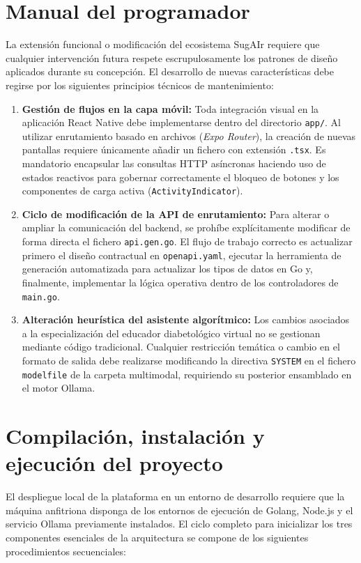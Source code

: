 \section{Manual del programador}
La extensión funcional o modificación del ecosistema SugAIr requiere que cualquier intervención futura respete escrupulosamente los patrones de diseño aplicados durante su concepción. El desarrollo de nuevas características debe regirse por los siguientes principios técnicos de mantenimiento:

\begin{enumerate}
    \item \textbf{Gestión de flujos en la capa móvil:} Toda integración visual en la aplicación React Native debe implementarse dentro del directorio \texttt{app/}. Al utilizar enrutamiento basado en archivos (\textit{Expo Router}), la creación de nuevas pantallas requiere únicamente añadir un fichero con extensión \texttt{.tsx}. Es mandatorio encapsular las consultas HTTP asíncronas haciendo uso de estados reactivos para gobernar correctamente el bloqueo de botones y los componentes de carga activa (\texttt{ActivityIndicator}).
    \item \textbf{Ciclo de modificación de la API de enrutamiento:} Para alterar o ampliar la comunicación del backend, se prohíbe explícitamente modificar de forma directa el fichero \texttt{api.gen.go}. El flujo de trabajo correcto es actualizar primero el diseño contractual en \texttt{openapi.yaml}, ejecutar la herramienta de generación automatizada para actualizar los tipos de datos en Go y, finalmente, implementar la lógica operativa dentro de los controladores de \texttt{main.go}.
    \item \textbf{Alteración heurística del asistente algorítmico:} Los cambios asociados a la especialización del educador diabetológico virtual no se gestionan mediante código tradicional. Cualquier restricción temática o cambio en el formato de salida debe realizarse modificando la directiva \texttt{SYSTEM} en el fichero \texttt{modelfile} de la carpeta multimodal, requiriendo su posterior ensamblado en el motor Ollama.
\end{enumerate}

\section{Compilación, instalación y ejecución del proyecto}
El despliegue local de la plataforma en un entorno de desarrollo requiere que la máquina anfitriona disponga de los entornos de ejecución de Golang, Node.js y el servicio Ollama previamente instalados. El ciclo completo para inicializar los tres componentes esenciales de la arquitectura se compone de los siguientes procedimientos secuenciales:

